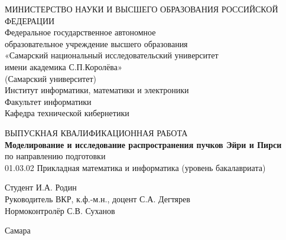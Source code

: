     \begin{titlepage}

        \center


        {МИНИСТЕРСТВО НАУКИ И ВЫСШЕГО ОБРАЗОВАНИЯ РОССИЙСКОЙ ФЕДЕРАЦИИ\\
        {Федеральное государственное автономное  \\[-0.2cm]
        образовательное учреждение высшего образования\\[-0.2cm]
        «Самарский национальный исследовательский университет \\[-0.2cm]
        имени академика С.П.Королёва»\\[-0.2cm]
        (Самарский университет)}\\[0.7cm]
        {Институт информатики, математики и электроники}\\[-0.2cm]
        {Факультет информатики}\\[-0.2cm]
        {Кафедра технической кибернетики}\\[2cm]
        }


        \vfill\vfill


        \vfill

        \begin{center}
            ВЫПУСКНАЯ КВАЛИФИКАЦИОННАЯ РАБОТА \\[1cm]
            \textbf{\large Моделирование и исследование распространения пучков Эйри и Пирси} \\[1cm]
            по направлению подготовки\\[-0.2cm]
            01.03.02 Прикладная математика и информатика (уровень бакалавриата)\\[2cm]
        \end{center}

        \begin{minipage}{0.8\textwidth}
            Студент    \hfill    И.А. Родин \\
            Руководитель ВКР, к.ф.-м.н., доцент \hfill  С.А. Дегтярев\\
            Нормоконтролёр        \hfill С.В. Суханов\\
        \end{minipage}

        \vfill\vfill\vfill

        {\centering Самара \the\year}


    \end{titlepage}

